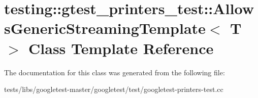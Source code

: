 \hypertarget{classtesting_1_1gtest__printers__test_1_1AllowsGenericStreamingTemplate}{}\section{testing\+:\+:gtest\+\_\+printers\+\_\+test\+:\+:Allows\+Generic\+Streaming\+Template$<$ T $>$ Class Template Reference}
\label{classtesting_1_1gtest__printers__test_1_1AllowsGenericStreamingTemplate}


The documentation for this class was generated from the following file\+:\begin{DoxyCompactItemize}
\item 
tests/libs/googletest-\/master/googletest/test/googletest-\/printers-\/test.\+cc\end{DoxyCompactItemize}
